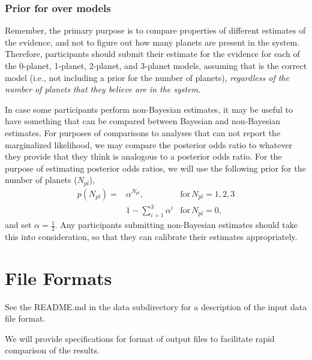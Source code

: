 \documentclass{article}
\begin{document}
\subsubsection{Prior for over models}
Remember, the primary purpose is to compare properties of different estimates of the evidence, and not to figure out how many planets are present in the system.  
Therefore, participants should submit their estimate for the evidence for each of the 0-planet, 1-planet, 2-planet, and 3-planet models, assuming that is the correct model (i.e., not including a prior for the number of planets), {\em regardless of the number of planets that they believe are in the system}.  

In case some participants perform non-Bayesian estimates, it may be useful to have something that can be compared between Bayesian and non-Bayesian estimates.  For purposes of comparisons to analyses that can not report the marginalized likelihood, we may compare the posterior odds ratio to whatever they provide that they think is analogous to a posterior odds ratio.  
For the purpose of estimating posterior odds ratios, we will use the following prior for the number of planets ($N_{pl}$),
\begin{eqnarray}
p(N_{pl}) = & \alpha^{N_{pl}}, \,\, & \mathrm{for} \, N_{pl}={1,2,3} \\
            & 1-\sum_{i=1}^3 \alpha^i & \mathrm{for} \, N_{pl}=0,
\end{eqnarray}
and set $\alpha=\frac{1}{3}$.  
Any participants submitting non-Bayesian estimates should take this into consideration, so that they can calibrate their estimates appropriately. 

\section{File Formats}
See the README.md in the data subdirectory for a description of the input data file format.

We will provide specifications for format of output files to facilitate rapid comparison of the results. 
\end{document}
